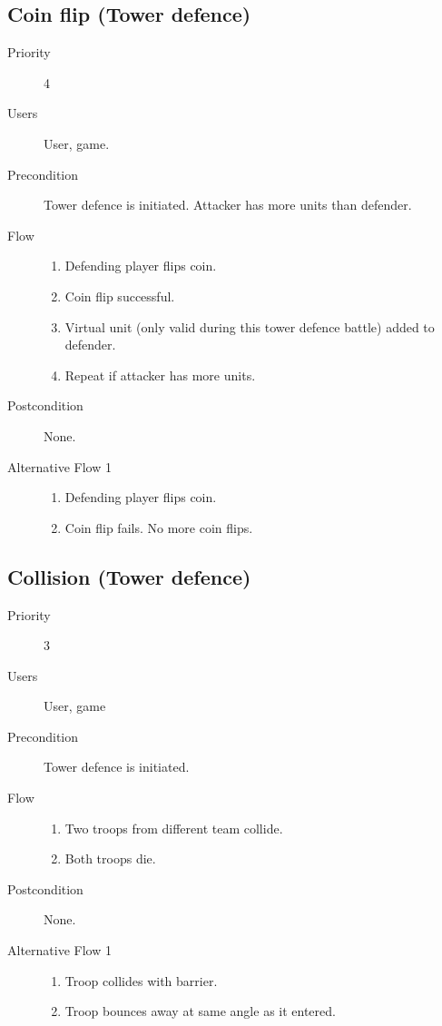 \documentclass[12pt,a4paper]{article}
\begin{document}
\subsection{Coin flip (Tower defence)}
\begin{description}
\item[Priority] 4
\item[Users] User, game.
\item[Precondition] Tower defence is initiated. Attacker has more
  units than defender.
\item[Flow]\mbox{}
  \begin{enumerate}
  \item Defending player flips coin.
  \item Coin flip successful.
  \item Virtual unit (only valid during this tower defence battle) added
    to defender.
  \item Repeat if attacker has more units.
  \end{enumerate}
\item[Postcondition] None.
\item[Alternative Flow 1]\mbox{}
  \begin{enumerate}
  \item Defending player flips coin.
  \item Coin flip fails. No more coin flips.
  \end{enumerate}
\end{description}

\subsection{Collision (Tower defence)}
\begin{description}
\item[Priority] 3
\item[Users] User, game
\item[Precondition] Tower defence is initiated.
\item[Flow]\mbox{}
  \begin{enumerate}
  \item Two troops from different team collide.
  \item Both troops die.
  \end{enumerate}
\item[Postcondition] None.
\item[Alternative Flow 1]\mbox{}
  \begin{enumerate}
  \item Troop collides with barrier.
  \item Troop bounces away at same angle as it entered.
  \end{enumerate}
\end{description}
\end{document}
